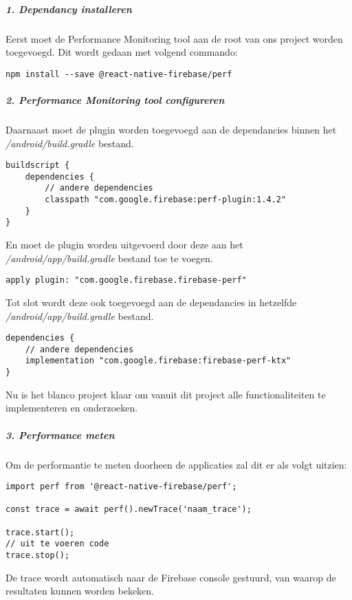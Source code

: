 \subparagraph{1. Dependancy installeren}
Eerst moet de Performance Monitoring tool aan de root van ons project worden toegevoegd. 
Dit wordt gedaan met volgend commando:
\begin{verbatim}
npm install --save @react-native-firebase/perf
\end{verbatim}

\subparagraph{2. Performance Monitoring tool configureren}
Daarnaast moet de plugin worden toegevoegd aan 
de dependancies binnen het \textit{/android/build.gradle} bestand. 
\begin{verbatim}
buildscript {
    dependencies {
        // andere dependencies
        classpath "com.google.firebase:perf-plugin:1.4.2"
    }
}
\end{verbatim}
En moet de plugin worden uitgevoerd door deze aan het \textit{/android/app/build.gradle} bestand toe te voegen.
\begin{verbatim}
apply plugin: "com.google.firebase.firebase-perf"
\end{verbatim}
Tot slot wordt deze ook toegevoegd aan de dependancies in hetzelfde \textit{/android/app/build.gradle} bestand.
\begin{verbatim}
dependencies {
    // andere dependencies
    implementation "com.google.firebase:firebase-perf-ktx"
}
\end{verbatim}
Nu is het blanco project klaar om vanuit dit project alle functionaliteiten te 
implementeren en onderzoeken.

\subparagraph{3. Performance meten}
Om de performantie te meten doorheen de applicaties zal dit er als 
volgt uitzien:
\begin{verbatim}
import perf from '@react-native-firebase/perf';

const trace = await perf().newTrace('naam_trace');

trace.start();
// uit te voeren code
trace.stop();

\end{verbatim}
De trace wordt automatisch naar de Firebase console gestuurd, van waarop de 
resultaten kunnen worden bekeken.